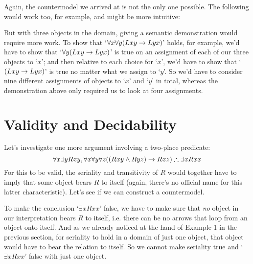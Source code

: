 Again, the countermodel we arrived at is not the only one possible.  The following would work too, for example, and might be more intuitive:
\begin{center}
\end{center}
But with three objects in the domain, giving a semantic demonstration would require more work.  To show that `$\forall x\forall y(Lxy \rightarrow Lyx)$' holds, for example, we'd have to show that `$\forall y(Lxy \rightarrow Lyx)$' is true on an assignment of each of our three objects to `$x$'; and then relative to each choice for `$x$', we'd have to show that `$(Lxy \rightarrow Lyx)$' is true no matter what we assign to `$y$'.  So we'd have to consider nine different assignments of objects to `$x$' and `$y$' in total, whereas the demonstration above only required us to look at four assignments.

\section{Validity and Decidability}

Let's investigate one more argument involving a two-place predicate:
$$\forall x\exists yRxy, \forall x \forall y \forall z((Rxy \wedge Ryz) \rightarrow Rxz) \therefore \exists xRxx$$
For this to be valid, the seriality and transitivity of $R$ would together have to imply that some object bears $R$ to itself (again, there's no official name for this latter characteristic).  Let's see if we can construct a countermodel.

To make the conclusion `$\exists xRxx$' false, we have to make sure that \emph{no} object in our interpretation bears $R$ to itself, i.e. there can be no arrows that loop from an object onto itself.  And as we already noticed at the hand of Example 1 in the previous section, for seriality to hold in a domain of just one object, that object would have to bear the relation to itself.  So we cannot make seriality true and `$\exists xRxx$' false with just one object.

